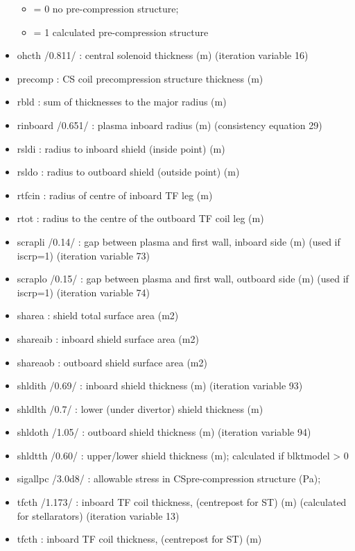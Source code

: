 \documentclass[]{article}
\providecommand{\tightlist}{%
  \setlength{\itemsep}{0pt}\setlength{\parskip}{0pt}}
\begin{document}
\begin{itemize}
  \begin{itemize}
  \tightlist
  \item
    = 0 no pre-compression structure;
  \item
    = 1 calculated pre-compression structure
  \end{itemize}
\item
  ohcth /0.811/ : central solenoid thickness (m) (iteration variable 16)
\item
  precomp : CS coil precompression structure thickness (m)
\item
  rbld : sum of thicknesses to the major radius (m)
\item
  rinboard /0.651/ : plasma inboard radius (m) (consistency equation 29)
\item
  rsldi : radius to inboard shield (inside point) (m)
\item
  rsldo : radius to outboard shield (outside point) (m)
\item
  rtfcin : radius of centre of inboard TF leg (m)
\item
  rtot : radius to the centre of the outboard TF coil leg (m)
\item
  scrapli /0.14/ : gap between plasma and first wall, inboard side (m)
  (used if iscrp=1) (iteration variable 73)
\item
  scraplo /0.15/ : gap between plasma and first wall, outboard side (m)
  (used if iscrp=1) (iteration variable 74)
\item
  sharea : shield total surface area (m2)
\item
  shareaib : inboard shield surface area (m2)
\item
  shareaob : outboard shield surface area (m2)
\item
  shldith /0.69/ : inboard shield thickness (m) (iteration variable 93)
\item
  shldlth /0.7/ : lower (under divertor) shield thickness (m)
\item
  shldoth /1.05/ : outboard shield thickness (m) (iteration variable 94)
\item
  shldtth /0.60/ : upper/lower shield thickness (m); calculated if
  blktmodel \textgreater{} 0
\item
  sigallpc /3.0d8/ : allowable stress in CSpre-compression structure
  (Pa);
\item
  tfcth /1.173/ : inboard TF coil thickness, (centrepost for ST) (m)
  (calculated for stellarators) (iteration variable 13)
\item
  tfcth : inboard TF coil thickness, (centrepost for ST) (m)

\end{itemize}
\end{document}
